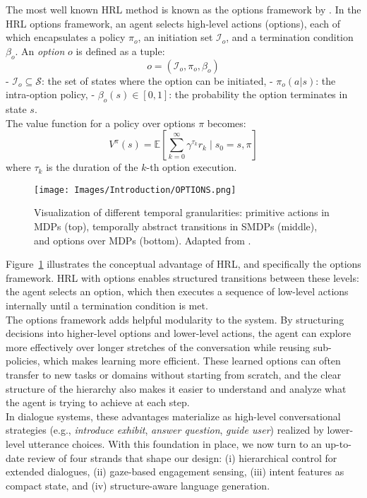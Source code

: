 \documentclass[12pt]{article}
\begin{document}
The most well known HRL method is known as the options framework by \cite{sutton1999between}. In the HRL options framework, an agent selects high-level actions (options), each of which encapsulates a policy $\pi_o$, an initiation set $\mathcal{I}_o$, and a termination condition $\beta_o$. An \textit{option} $o$ is defined as a tuple:
\[
o = (\mathcal{I}_o, \pi_o, \beta_o)
\]
- $\mathcal{I}_o \subseteq \mathcal{S}$: the set of states where the option can be initiated,
- $\pi_o(a|s)$: the intra-option policy,
- $\beta_o(s) \in [0,1]$: the probability the option terminates in state $s$.\\

The value function for a policy over options $\pi$ becomes:
\[
V^\pi(s) = \mathbb{E} \left[ \sum_{k=0}^{\infty} \gamma^{\tau_k} r_k \mid s_0 = s, \pi \right]
\]
where $\tau_k$ is the duration of the $k$-th option execution.\\

\begin{figure}[h]
    \centering
    \texttt{[image: Images/Introduction/OPTIONS.png]}
    \caption{Visualization of different temporal granularities: primitive actions in MDPs (top), temporally abstract transitions in SMDPs (middle), and options over MDPs (bottom). Adapted from \citet{sutton1999between}.}
    \label{fig:options}
\end{figure}

Figure~\ref{fig:options} illustrates the conceptual advantage of HRL, and specifically the options framework. HRL with options enables structured transitions between these levels: the agent selects an option, which then executes a sequence of low-level actions internally until a termination condition is met.\\

The options framework adds helpful modularity to the system. By structuring decisions into higher-level options and lower-level actions, the agent can explore more effectively over longer stretches of the conversation while reusing sub-policies, which makes learning more efficient. These learned options can often transfer to new tasks or domains without starting from scratch, and the clear structure of the hierarchy also makes it easier to understand and analyze what the agent is trying to achieve at each step.\\

In dialogue systems, these advantages materialize as high-level conversational strategies (e.g., \emph{introduce exhibit}, \emph{answer question}, \emph{guide user}) realized by lower-level utterance choices. With this foundation in place, we now turn to an up-to-date review of four strands that shape our design: (i) hierarchical control for extended dialogues, (ii) gaze-based engagement sensing, (iii) intent features as compact state, and (iv) structure-aware language generation.
\end{document}
